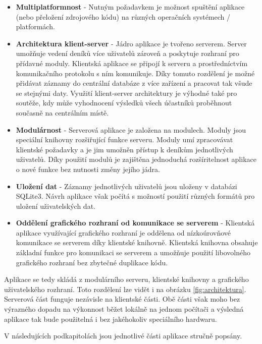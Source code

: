 \begin{itemize}
\item \textbf{Multiplatformnost} - Nutným požadavkem je možnost spuštění
aplikace (nebo přeložení zdrojového kódu) na různých operačních systémech / platformách.
\item \textbf{Architektura klient-server} - Jádro aplikace je tvořeno serverem.
Server umožňuje vedení deníků více uživatelů zároveň a poskytuje rozhraní pro přídavné moduly.
Klientská aplikace se připojí k serveru a prostředníctvím komunikačního protokolu s ním komunikuje.
Díky tomuto rozdělení je možné přidávat záznamy do centrální databáze z více zařízení a pracovat
tak všude se stejnými daty. Využití klient-server architektury je výhodné také pro soutěže, kdy může vyhodnocení
výsledků všech účastníků proběhnout současně na centrálním místě.
\item \textbf{Modulárnost} - Serverová aplikace je založena na modulech. Moduly jsou speciální knihovny rozšiřující funkce
serveru. Moduly umí zpracovávat klientské požadavky a je jim umožněn přístup k deníkům jednotlivých uživatelů. Díky použití modulů
je zajištěna jednoduchá rozšíritelnost aplikace o nové funkce bez nutnosti změny jejího jádra.
\item \textbf{Uložení dat} - Záznamy jednotlivých uživatelů jsou uloženy v databázi SQLite3. Návrh aplikace
však počítá s možností použití různých formátů pro uložení uživatelských dat.
\item \textbf{Oddělení grafického rozhraní od komunikace se serverem} - Klientská aplikace využívající grafického rozhraní
je oddělena od nízkoúrovňové komunikace se serverem díky klientské knihovně. Klientská knihovna obsahuje základní funkce
pro komunikaci se serverem a umožňuje použití libovolného grafického rozhraní bez zbytečné duplikace kódu.
\end{itemize}

Aplikace se tedy skládá z modulárního serveru, klientské knihovny a grafického uživatelského rozhraní.
Toto rozdělení lze vidět i na obrázku \ref{fig:architektura}.
Serverová část funguje nezávisle na klientské části. Obě části však moho bez výrazného dopadu 
na výkonnost běžet lokálně na jednom počítači a výsledná aplikace tak bude použitelná i bez
jakéhokoliv speciálního hardwaru.

V následujících podkapitolách jsou jednotlivé části aplikace stručně popsány.

